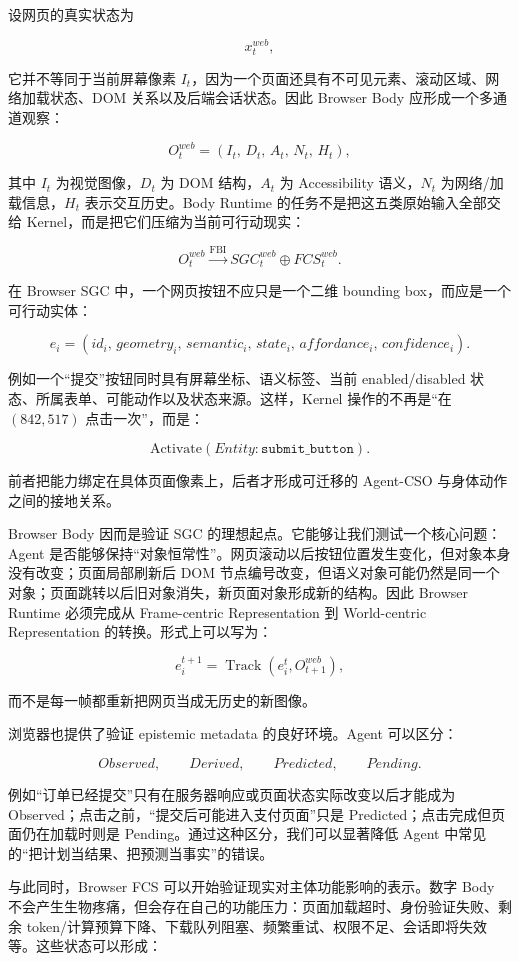设网页的真实状态为

$$
x_t^{web},
$$

它并不等同于当前屏幕像素 $I_t$，因为一个页面还具有不可见元素、滚动区域、网络加载状态、DOM 关系以及后端会话状态。因此 Browser Body 应形成一个多通道观察：

$$
O_t^{web}
=
\left(
I_t,\,
D_t,\,
A_t,\,
N_t,\,
H_t
\right),
$$

其中 $I_t$ 为视觉图像，$D_t$ 为 DOM 结构，$A_t$ 为 Accessibility 语义，$N_t$ 为网络/加载信息，$H_t$ 表示交互历史。Body Runtime 的任务不是把这五类原始输入全部交给 Kernel，而是把它们压缩为当前可行动现实：

$$
O_t^{web}
\xrightarrow{\mathrm{FBI}}
SGC_t^{web}\oplus FCS_t^{web}.
$$

在 Browser SGC 中，一个网页按钮不应只是一个二维 bounding box，而应是一个可行动实体：

$$
e_i=
(
id_i,\,
geometry_i,\,
semantic_i,\,
state_i,\,
affordance_i,\,
confidence_i
).
$$

例如一个“提交”按钮同时具有屏幕坐标、语义标签、当前 enabled/disabled 状态、所属表单、可能动作以及状态来源。这样，Kernel 操作的不再是“在 $(842,517)$ 点击一次”，而是：

$$
\mathrm{Activate}(Entity:\texttt{submit\_button}).
$$

前者把能力绑定在具体页面像素上，后者才形成可迁移的 Agent-CSO 与身体动作之间的接地关系。

Browser Body 因而是验证 SGC 的理想起点。它能够让我们测试一个核心问题：Agent 是否能够保持“对象恒常性”。网页滚动以后按钮位置发生变化，但对象本身没有改变；页面局部刷新后 DOM 节点编号改变，但语义对象可能仍然是同一个对象；页面跳转以后旧对象消失，新页面对象形成新的结构。因此 Browser Runtime 必须完成从 Frame-centric Representation 到 World-centric Representation 的转换。形式上可以写为：

$$
e_i^{t+1}
=
\operatorname{Track}
\left(
e_i^t,O_{t+1}^{web}
\right),
$$

而不是每一帧都重新把网页当成无历史的新图像。

浏览器也提供了验证 epistemic metadata 的良好环境。Agent 可以区分：

$$
Observed,\qquad
Derived,\qquad
Predicted,\qquad
Pending.
$$

例如“订单已经提交”只有在服务器响应或页面状态实际改变以后才能成为 Observed；点击之前，“提交后可能进入支付页面”只是 Predicted；点击完成但页面仍在加载时则是 Pending。通过这种区分，我们可以显著降低 Agent 中常见的“把计划当结果、把预测当事实”的错误。

与此同时，Browser FCS 可以开始验证现实对主体功能影响的表示。数字 Body 不会产生生物疼痛，但会存在自己的功能压力：页面加载超时、身份验证失败、剩余 token/计算预算下降、下载队列阻塞、频繁重试、权限不足、会话即将失效等。这些状态可以形成：

